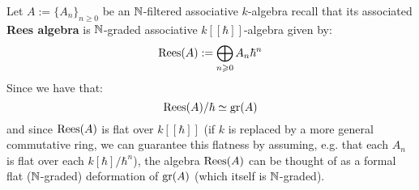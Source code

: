         \begin{example} \label{example: rees_algebras_as_formal_flat_deformations}
            Let $A := \{A_n\}_{n \geq 0}$ be an $\mathbb{N}$-filtered associative $k$-algebra recall that its associated \textbf{Rees algebra} is $\mathbb{N}$-graded associative $k[\![\hbar]\!]$-algebra given by:
                $$\operatorname{Rees}(A) := \bigoplus_{n \geqslant 0} A_n \hbar^n$$
            Since we have that:
                $$\operatorname{Rees}(A)/\hbar \simeq \operatorname{gr}(A)$$
            and since $\operatorname{Rees}(A)$ is flat over $k[\![\hbar]\!]$ (if $k$ is replaced by a more general commutative ring, we can guarantee this flatness by assuming, e.g. that each $A_n$ is flat over each $k[\hbar]/\hbar^n$), the algebra $\operatorname{Rees}(A)$ can be thought of as a formal flat ($\mathbb{N}$-graded) deformation of $\operatorname{gr}(A)$ (which itself is $\mathbb{N}$-graded). 
        \end{example}

